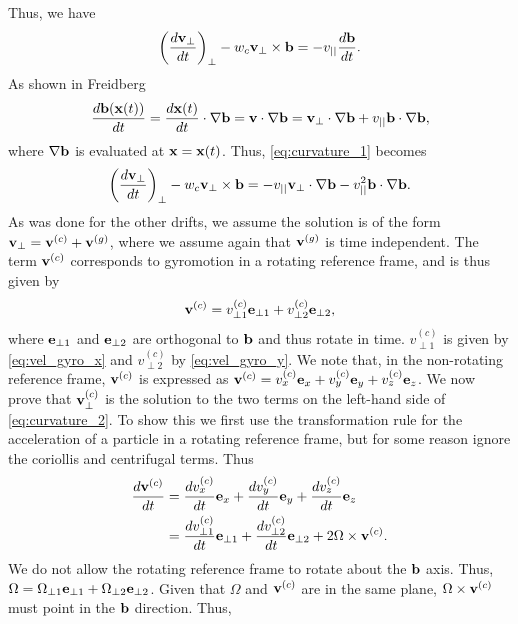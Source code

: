 \documentclass[a4paper,11pt]{report}
\begin{document}
Thus, we have
\begin{equation}
\label{eq:curvature_1}
    \left ( \frac{ d \mathbf{v}_\perp}{dt} \right )_\perp - w_c \mathbf{v}_\perp \times \mathbf{b} = -v_{||} \frac{d\mathbf{b}}{dt}.
\end{equation}
As shown in Freidberg
\begin{equation}
    \frac{d \mathbf{b}(\mathbf{x}(t))}{dt} = \frac{d \mathbf{x}(t)}{dt} \cdot \nabla \mathbf{b} = \mathbf{v} \cdot \nabla \mathbf{b} = \mathbf{v}_\perp \cdot \nabla \mathbf{b} + v_{||} \mathbf{b} \cdot \nabla \mathbf{b},
\end{equation}
where $\nabla \mathbf{b}$ is evaluated at $\mathbf{x} = \mathbf{x}(t)$. Thus, \cref{eq:curvature_1} becomes
\begin{equation}
\label{eq:curvature_2}
    \left ( \frac{ d \mathbf{v}_\perp}{dt} \right )_\perp - w_c \mathbf{v}_\perp \times \mathbf{b} = -v_{||} \mathbf{v}_\perp \cdot \nabla \mathbf{b} - v_{||}^2 \mathbf{b} \cdot \nabla \mathbf{b}.
\end{equation}
As was done for the other drifts, we assume the solution is of the form $\mathbf{v}_\perp = \mathbf{v}^{(c)} + \mathbf{v}^{(g)}$, where we assume again that $\mathbf{v}^{(g)}$ is time independent. The term $\mathbf{v}^{(c)}$ corresponds to gyromotion in a rotating reference frame, and is thus given by 
\begin{equation}
    \mathbf{v}^{(c)} = v^{(c)}_{\perp1} \mathbf{e}_{\perp1} + v^{(c)}_{\perp2} \mathbf{e}_{\perp2},
\end{equation}
where $\mathbf{e}_{\perp1}$ and $\mathbf{e}_{\perp2}$ are orthogonal to $\mathbf{b}$ and thus rotate in time. $v^{(c)}_{\perp1}$ is given by \cref{eq:vel_gyro_x} and $v^{(c)}_{\perp2}$ by \cref{eq:vel_gyro_y}. We note that, in the non-rotating reference frame, $\mathbf{v}^{(c)}$ is expressed as $\mathbf{v}^{(c)} = v^{(c)}_x \mathbf{e}_x + v^{(c)}_y \mathbf{e}_y + v^{(c)}_z \mathbf{e}_z$. We now prove that $\mathbf{v}_\perp^{(c)}$ is the solution to the two terms on the left-hand side of \cref{eq:curvature_2}. To show this we first use the transformation rule for the acceleration of a particle in a rotating reference frame, but for some reason ignore the coriollis and centrifugal terms. Thus
\begin{align}
    \frac{d \mathbf{v}^{(c)}}{dt} &= \frac{dv^{(c)}_x}{dt} \mathbf{e}_x + \frac{dv^{(c)}_y}{dt} \mathbf{e}_y + \frac{dv^{(c)}_z}{dt} \mathbf{e}_z \nonumber \\ &= \frac{dv^{(c)}_{\perp1}}{dt} \mathbf{e}_{\perp1} + \frac{dv^{(c)}_{\perp2}}{dt} \mathbf{e}_{\perp2} + 2\Omega \times \mathbf{v}^{(c)}.
\end{align}
We do not allow the rotating reference frame to rotate about the $\mathbf{b}$ axis. Thus, $\Omega = \Omega_{\perp1} \mathbf{e}_{\perp1} + \Omega_{\perp2} \mathbf{e}_{\perp2}$. Given that $\Omega$ and $\mathbf{v}^{(c)}$ are in the same plane, $\Omega \times \mathbf{v}^{(c)}$ must point in the $\mathbf{b}$ direction. Thus, 
\end{document}
